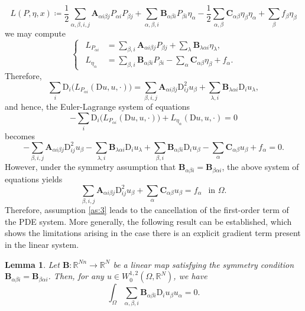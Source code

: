\documentclass{amsart}
\numberwithin{equation}{section}
\numberwithin{thm}{section}
\newtheorem{lem}[thm]{Lemma}
\theoremstyle{definition}
\def\D{\mathrm{D}}
\renewcommand{\:}{\!:\!} %
\renewcommand{\^}[1]{^{#1}_{\phantom{l}}}
\begin{document}
\begin{equation*}
L(P, \eta, x) \coloneqq \frac{1}{2}\sum_{\alpha, \beta, i, j} \mathbf{A}_{\alpha i \beta j} P_{\alpha i}P_{\beta j} + \sum_{\alpha, \beta, i} \mathbf{B}_{\alpha \beta i}P_{\beta i} \eta_{\alpha} - \frac{1}{2}\sum_{\alpha, \beta} \mathbf{C}_{\alpha \beta} \eta_{\beta}\eta_{\alpha} + \sum_{\beta} f_{\beta}\eta_{\beta}
\end{equation*}
we may compute
\[
\left\{ 
 \ \ 
\begin{split}
L_{P_{\alpha i}} &= \sum_{\beta, i} \mathbf{A}_{\alpha i \beta j}P_{\beta j} + \sum_{\lambda} \mathbf{B}_{\lambda \alpha i} \eta_{\lambda},
\\
L_{\eta_{\alpha}} &= \sum_{\beta, i} \mathbf{B}_{\alpha \beta i} P_{\beta i} - \sum_{\alpha} \mathbf{C}_{\alpha \beta}\eta_{\beta} + f_{\alpha}.
\end{split}
\right.
\]
Therefore,
\[
\sum_{i}\D_i  \big(L_{P_{\alpha i}}(\mathrm{D}u, u, \cdot)\big) = \sum_{\beta, i, j} \mathbf{A}_{\alpha i \beta j}\mathrm{D}^2_{ij}u_{\beta} + \sum_{\lambda, i} \mathbf{B}_{\lambda \alpha i} \mathrm{D}_iu_{\lambda},
\]
and hence, the Euler-Lagrange system of equations
\[
-\sum_{i}\D_i\big(L_{P_{\alpha i}}(\mathrm{D}u, u, \cdot)\big) + L_{\eta_{\alpha}}(\mathrm{D}u, u, \cdot) = 0
\]
becomes
\[
-\sum_{\beta, i, j} \mathbf{A}_{\alpha i \beta j}\mathrm{D}^2_{ij}u_{\beta} - \sum_{\lambda, i} \mathbf{B}_{\lambda \alpha i} \mathrm{D}_iu_\lambda + \sum_{\beta, i} \mathbf{B}_{\alpha \beta i} \mathrm{D}_iu_\beta- \sum_{\alpha} \mathbf{C}_{\alpha \beta}u_{\beta} + f_{\alpha} = 0.
\]
However, under the symmetry assumption that $\mathbf{B}_{\alpha \beta i} = \mathbf{B}_{\beta \alpha i}$, the above system of equations yields
\begin{equation}
\sum_{\beta, i, j} \mathbf{A}_{\alpha i \beta j}\mathrm{D}^2_{ij}u_{\beta} +\sum_{\alpha} \mathbf{C}_{\alpha \beta}u_{\beta} = f_{\alpha} \ \ \text{ in $\Omega$.}
\end{equation}
Therefore, assumption \eqref{as:3} leads to the cancellation of the first-order term of the PDE system. More generally, the following result can be established, which shows the limitations arising in the case there is an explicit gradient term present in the linear system.


\begin{lem} \label{lem:1}
Let $\mathbf{B}: \mathbb{R}^{Nn} \longrightarrow \mathbb{R}^{N}$ be a linear map satisfying the symmetry condition $\mathbf{B}_{\alpha \beta i} = \mathbf{B}_{\beta \alpha i}$. Then, for any $u \in W^{1,2}_0(\Omega, \mathbb{R}^N)$, we have
\begin{equation*}
\int_{\Omega} \sum_{\alpha, \beta, i}\mathbf{B}_{\alpha \beta i} \mathrm{D}_i u_{\beta} u_{\alpha} = 0.
\end{equation*}
\end{lem}
\end{document}
